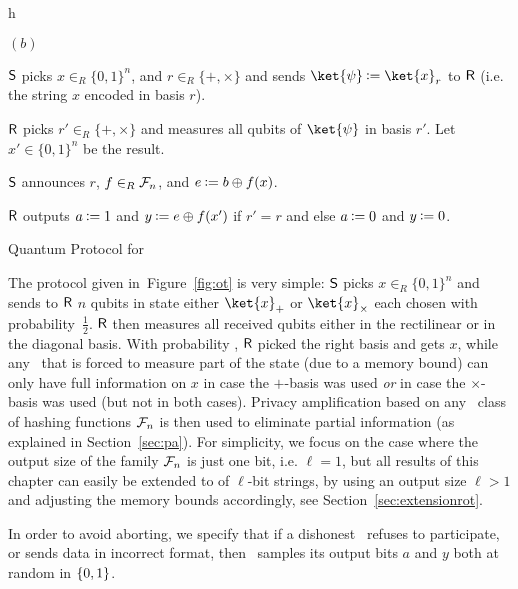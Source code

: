 \begin{myfigure}{h}
 \begin{myprotocol}{\qot$(b)$}
      \item ${\sf S}$ picks $x\in_R\{0,1\}^n$, and $r\in_R\{+,\times \}$
        and sends $\ket{\psi} \assign \ket{x}_r$ %
            to ${\sf R}$ (i.e. the string $x$ encoded in basis $r$).
      \item ${\sf R}$ picks $r'\in_R\{+,\times \}$ and measures all qubits
       of $\ket{\psi}$ in basis $r'$. Let $x'\in\{0,1\}^n$ be the
       result.
      \item ${\sf S}$ announces $r$, $f\in_R \mathcal{F}_{n}$, and $e \assign b\oplus \hf(x)$.\label{bound}
      \item ${\sf R}$ outputs $a \assign 1$ and $y \assign e\oplus \hf(x')$ if $r'=r$ and else $a \assign 0$ and $y \assign 0$.
 \end{myprotocol}
\caption{Quantum Protocol for \RabinOT}\label{fig:ot}
\end{myfigure}

The protocol given in~Figure~\ref{fig:ot} is very simple: ${\sf S}$ picks
$x\in_R\{0,1\}^n$ and sends to
${\sf R}$ $n$ qubits in state either $\ket{x}_+$ %
or $\ket{x}_{\times}$ %
each chosen with probability~$\frac{1}{2}$.  ${\sf R}$ then measures all
received qubits either in the rectilinear or in the diagonal basis.
  With probability
, ${\sf R}$ picked the right basis and gets $x$, while
any \dB\ that is forced to measure part of the state (due to a memory
bound) can only have full information on $x$ in case the $+$-basis was
used {\em or} in case the $\times$-basis was used (but not in both
cases). Privacy amplification based on
any \univ\ class of hashing functions $\mathcal{F}_{n}$ is then used to
eliminate partial information (as explained in Section~\ref{sec:pa}).
For simplicity, we focus on the case where the output size of the
family $\mathcal{F}_{n}$ is just one bit, i.e. $\ell=1$, but all results of
this chapter can easily be extended to \RabinlStringOT of $\ell$-bit
strings, by using an output size $\ell > 1$ and adjusting the memory
bounds accordingly, see Section~\ref{sec:extensionrot}.

In order to avoid aborting, we specify that if a dishonest \dA\ 
refuses to participate, or sends data in incorrect format, then \B\ 
samples its output bits $a$ and $y$ both at random in $\{0,1\}$.

